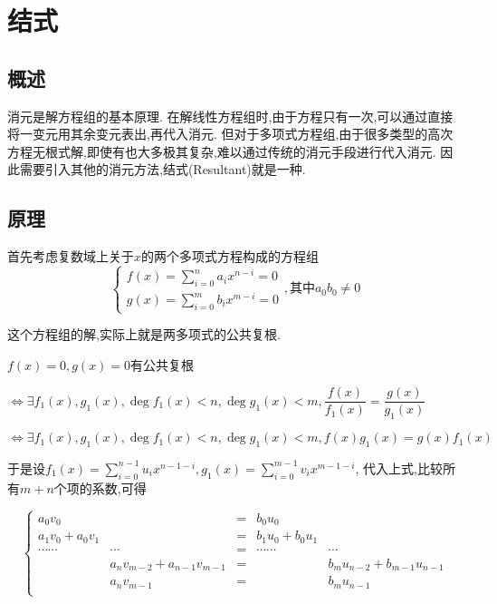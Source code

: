 \section{结式}
\subsection{概述}
	消元是解方程组的基本原理.
	在解线性方程组时,由于方程只有一次,可以通过直接将一变元用其余变元表出,再代入消元.
	但对于多项式方程组,由于很多类型的高次方程无根式解,即使有也大多极其复杂,难以通过传统的消元手段进行代入消元.
	因此需要引入其他的消元方法,结式(Resultant)就是一种.

\subsection{原理}
	首先考虑复数域上关于$ x$的两个多项式方程构成的方程组
	\[  \begin{cases} 
			f(x)=\sum_{i=0}^{n}{a_ix^{n-i}}=0 \\
			g(x)=\sum_{i=0}^{m}{b_ix^{m-i}}=0
	\end{cases} , \texttt{其中} a_0b_0\ne0\]

	这个方程组的解,实际上就是两多项式的公共复根.


	$ f(x)=0,g(x)=0$有公共复根

	$ \Leftrightarrow \exists f_1(x), g_1(x), \deg f_1(x) < n, \deg g_1(x) < m, \dfrac{f(x)}{f_1(x)} = \dfrac{g(x)}{g_1(x)}$

	$ \Leftrightarrow \exists f_1(x),g_1(x),\deg f_1(x)<n,\deg g_1(x)<m,f(x)g_1(x)=g(x)f_1(x)$

	于是设$ f_1(x)=\sum_{i=0}^{n-1}{u_ix^{n-1-i}},g_1(x)=\sum_{i=0}^{m-1}{v_ix^{m-1-i}}$,
	代入上式,比较所有$ m+n$个项的系数,可得

	\[ \left \{  \begin{array}{lrclr}
	a_0v_0		&			&= &b_0u_0		&		\\
	a_1v_0+a_0v_1&			&= &b_1u_0+b_0u_1&		\\
	\cdots \cdots &\cdots	&= & \cdots\cdots &\cdots		\\
			&{a_nv_{m-2}+a_{n-1}v_{m-1}}&=&		&b_mu_{n-2}+b_{m-1}u_{n-1}\\
			& a_nv_{m-1}&= &				&b_mu_{n-1}\\
	\end{array}\right . \]

